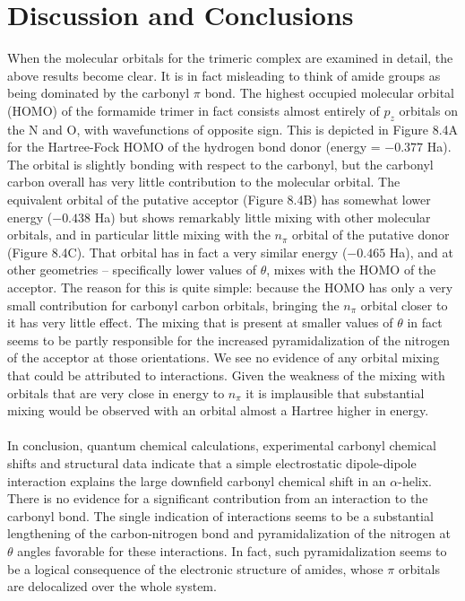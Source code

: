 \section{Discussion and Conclusions}

\begin{doublespace}
When the molecular orbitals for the trimeric complex are examined in detail, 
the above results become clear. It is in fact misleading to think of amide 
groups as being dominated by the carbonyl $\pi$ bond. The highest occupied
molecular orbital (HOMO) of the formamide trimer in fact consists almost
entirely of $p_z$ orbitals on the N and O, with wavefunctions of opposite sign.
This is depicted in Figure 8.4A for the Hartree-Fock HOMO of the hydrogen bond
donor (energy = $-0.377$ Ha). The orbital is slightly bonding with respect to
the carbonyl, but the carbonyl carbon overall has very little contribution to
the molecular orbital. The equivalent orbital of the putative acceptor
(Figure 8.4B) has somewhat lower energy ($-0.438$ Ha) but shows remarkably
little mixing with other molecular orbitals, and in particular little mixing
with the $n_\pi$ orbital of the putative \npipistar{} donor (Figure 8.4C). That
orbital has in fact a very similar energy ($-0.465$ Ha), and at other
geometries -- specifically lower values of $\theta$, mixes with the HOMO of
the acceptor. The reason for this is quite simple: because the HOMO has only a
very small contribution for carbonyl carbon orbitals, bringing the $n_\pi$
orbital closer to it has very little effect. The mixing that is present at
smaller values of $\theta$ in fact seems to be partly responsible for the
increased pyramidalization of the nitrogen of the acceptor at those
orientations. We see no evidence of any orbital mixing that could be attributed
to \npipistar{} interactions. Given the weakness of the mixing with orbitals
that are very close in energy to $n_\pi$ it is implausible that substantial
mixing would be observed with an orbital almost a Hartree higher in energy.
\\\\
In conclusion, quantum chemical calculations, experimental carbonyl \cnmr{}
chemical shifts and structural data indicate that a simple electrostatic
dipole-dipole interaction explains the large downfield carbonyl \cnmr{}
chemical shift in an $\alpha$-helix. There is no evidence for a significant
contribution from an \npistar{} interaction to the carbonyl bond. The single
indication of \npistar{} interactions seems to be a substantial lengthening of
the carbon-nitrogen bond and pyramidalization of the nitrogen at $\theta$
angles favorable for these interactions. In fact, such pyramidalization seems
to be a logical consequence of the electronic structure of amides, whose $\pi$
orbitals are delocalized over the whole system.
\end{doublespace}




